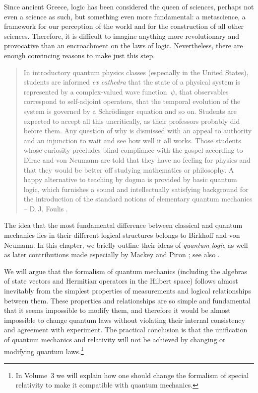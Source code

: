 \documentclass[nochecklpage]{stefan1}
\theoremstyle{definition}
\begin{document}
Since ancient Greece, logic has been considered the queen of sciences,
perhaps not even a science as such, but something even more fundamental:
a metascience, a framework for our perception of the world and for the
construction of all other sciences. Therefore, it is difficult to
imagine anything more revolutionary and provocative than an encroachment
on the laws of logic. Nevertheless, there are enough convincing reasons
to make just this step.
%
\begin{quote}
In introductory quantum physics classes (especially in the United
States), students are informed \emph{ex cathedra} that the state of a
physical system is represented by a complex-valued wave function~$\psi $,
that observables correspond to self-adjoint operators, that the
temporal evolution of the system is governed by a Schr\"{o}dinger
equation and so on. Students are expected to accept all this
uncritically, as their professors probably did before them. Any question
of why is dismissed with an appeal to authority and an injunction to
wait and see how well it all works. Those students whose curiosity
precludes blind compliance with the gospel according to Dirac and von
Neumann are told that they have no feeling for physics and that they
would be better off studying mathematics or philosophy. A happy
alternative to teaching by dogma is provided by basic quantum logic,
which furnishes a sound and intellectually satisfying background for the
introduction of the standard notions of elementary quantum mechanics --
D.\,J. Foulis \cite{Foulis}.
\end{quote}
%
The idea that the most fundamental difference between classical and
quantum mechanics lies in their different logical structures belongs to
Birkhoff and von Neumann. In this chapter, we briefly outline their
ideas of \emph{quantum logic} \cite{Birkhoff} as well as later
contributions made especially by Mackey \cite{Mackey} and Piron
\cite{Piron2, Piron}; see also \cite{Curcuraci}.

We will argue that the formalism of quantum mechanics (including the
algebras of state vectors and Hermitian operators in the Hilbert space)
follows almost inevitably from the simplest properties of measurements
and logical relationships between them. These properties and
relationships are so simple and fundamental that it seems impossible to
modify them, and therefore it would be almost impossible to change
quantum laws without violating their internal consistency and agreement
with experiment. The practical conclusion is that the unification of
quantum mechanics and relativity will not be achieved by changing or
modifying quantum laws.\footnote{In Volume~3 we will
explain how one should change the formalism of special relativity to
make it compatible with quantum mechanics.}
\end{document}
